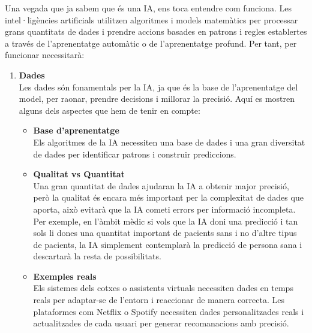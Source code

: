 Una vegada que ja sabem que és una IA, ens toca entendre com funciona. Les intel·ligències artificials utilitzen algoritmes i models matemàtics per processar grans quantitats de dades i prendre accions basades en patrons i regles establertes a través de l'aprenentatge automàtic o de l'aprenentatge profund. Per tant, per funcionar necessitarà:
\begin{enumerate}
    \item \textbf{Dades}\\
    Les dades són fonamentals per la IA, ja que és la base de l'aprenentatge del model, per raonar, prendre decisions i millorar la precisió. Aquí es mostren alguns dels aspectes que hem de tenir en compte:
    \begin{itemize}
        \item \textbf{Base d'aprenentatge}\\
        Els algoritmes de la IA necessiten una base de dades i una gran diversitat de dades per identificar patrons i construir prediccions.

        \item \textbf{Qualitat vs Quantitat}\\
        Una gran quantitat de dades ajudaran la IA a obtenir major precisió, però la qualitat és encara més important per la complexitat de dades que aporta, això evitarà que la IA cometi errors per informació incompleta. Per exemple, en l'àmbit mèdic si vols que la IA doni una predicció i tan sols li dones una quantitat important de pacients sans i no d'altre tipus de pacients, la IA simplement contemplarà la predicció de persona sana i descartarà la resta de possibilitats.

        \item \textbf{Exemples reals}\\
        Els sistemes dels cotxes o assistents virtuals necessiten dades en temps reals per adaptar-se de l'entorn i reaccionar de manera correcta. Les plataformes com Netflix o Spotify necessiten dades personalitzades reals i actualitzades de cada usuari per generar recomanacions amb precisió.
    \end{itemize}


\end{enumerate}
